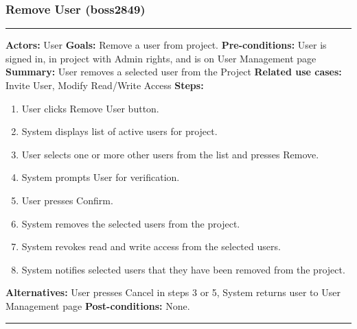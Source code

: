 \documentclass[11pt]{report}
\begin{document}
\subsubsection{Remove User  (boss2849)}
\vspace{2pt}
\hrule
\vspace{8pt}
 \textbf{Actors:} User \newline
\textbf{Goals:} Remove a user from project. \newline
 \textbf{Pre-conditions:} User is signed in, in project with Admin rights, and is on User Management page\newline
 \textbf{Summary:} User removes a selected user from the Project \newline
\textbf{Related use cases:} Invite User, Modify Read/Write Access \newline
\textbf{Steps:} \begin{enumerate}
  \item User clicks Remove User button.
  \item System displays list of active users for project.
  \item User selects one or more other users from the list and presses Remove.
  \item System prompts User for verification.
  \item User presses Confirm.
  \item System removes the selected users from the project.
  \item System revokes read and write access from the selected users.
  \item System notifies selected users that they have been removed from the project.
 \end{enumerate}
 \textbf{Alternatives:} User presses Cancel in steps 3 or 5, System returns user to User Management page \newline
 \textbf{Post-conditions:} None. \newline
\vspace{8pt}
\hrule
\newpage
\end{document}
